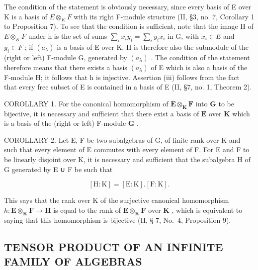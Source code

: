 The condition of the statement is obviously necessary, since every basis of E over K is a basis of \(E \otimes_{K} F\) with its right F-module structure (II, §3, no. 7, Corollary 1 to Proposition 7). To see that the condition is sufficient, note that the image H of \(E \otimes_{K} F\) under h is the set of sums \(\sum_{i} x_{i} y_{i} = \sum_{i} y_{i} x_{i}\) in G, with \(x_{i} \in E\) and \(y_{i} \in F\) ; if \((a_{\lambda})\) is a basis of E over K, H is therefore also the submodule of the (right or left) F-module G, generated by \((a_{\lambda})\) . The condition of the statement therefore means that there exists a basis \((a_{\lambda})\) of E which is also a basis of the F-module H; it follows that h is injective. Assertion (iii) follows from the fact that every free subset of E is contained in a basis of E (II, §7, no. 1, Theorem 2).

COROLLARY 1. For the canonical homomorphism of \(\mathbf{E} \otimes_{\mathbf{K}} \mathbf{F}\) into \(\mathbf{G}\) to be bijective, it is necessary and sufficient that there exist a basis of \(\mathbf{E}\) over \(\mathbf{K}\) which is a basis of the (right or left) F-module \(\mathbf{G}\) .

COROLLARY 2. Let E, F be two subalgebras of G, of finite rank over K and such that every element of E commutes with every element of F. For E and F to be linearly disjoint over K, it is necessary and sufficient that the subalgebra H of G generated by E ∪ F be such that

\[
[ \mathrm{H}: \mathrm{K} ] = [ \mathrm{E}: \mathrm{K} ]. [ \mathrm{F}: \mathrm{K} ].\tag{12}
\]

This says that the rank over K of the surjective canonical homomorphism \(h: \mathbf{E} \otimes_{\mathbf{K}} \mathbf{F} \to \mathbf{H}\) is equal to the rank of \(\mathbf{E} \otimes_{\mathbf{K}} \mathbf{F}\) over \(\mathbf{K}\) , which is equivalent to saying that this homomorphism is bijective (II, § 7, No.~4, Proposition 9).

\subsection{TENSOR PRODUCT OF AN INFINITE FAMILY OF ALGEBRAS}

